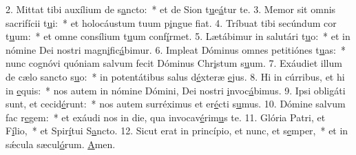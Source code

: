 2. Mittat tibi auxílium de s\uline{a}ncto:~* et de Sion t\uline{u}e\uline{á}tur te.
3. Memor sit omnis sacrifícii t\uline{u}i:~* et holocáustum tuum p\uline{i}ngue f\uline{i}at.
4. Tríbuat tibi secúndum cor t\uline{u}um:~* et omne consílium t\uline{u}um conf\uline{í}rmet.
5. Lætábimur in salutári t\uline{u}o:~* et in nómine Dei nostri magn\uline{i}fic\uline{á}bimur.
6. Impleat Dóminus omnes petitiónes t\uline{u}as:~* nunc cognóvi quóniam salvum fecit Dóminus Chr\uline{i}stum s\uline{u}um.
7. Exáudiet illum de cælo sancto s\uline{u}o:~* in potentátibus salus d\uline{é}xteræ \uline{e}jus.
8. Hi in cúrribus, et hi in \uline{e}quis:~* nos autem in nómine Dómini, Dei nostri \uline{i}nvoc\uline{á}bimus.
9. Ipsi obligáti sunt, et cecid\uline{é}runt:~* nos autem surréximus et er\uline{é}cti s\uline{u}mus.
10. Dómine salvum fac r\uline{e}gem:~* et exáudi nos in die, qua invocav\uline{é}rim\uline{u}s te.
11. Glória Patri, et F\uline{í}lio,~* et Spir\uline{í}tui S\uline{a}ncto.
12. Sicut erat in princípio, et nunc, et s\uline{e}mper,~* et in sǽcula sæcul\uline{ó}rum. \uline{A}men.
